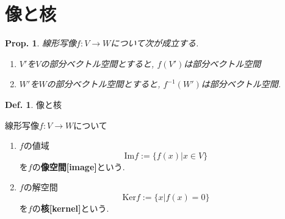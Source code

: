 \documentclass[a4paper,10pt,report]{amsart}
\theoremstyle{plain}
\newtheorem{prop}{Prop.}[section]
\theoremstyle{definition}
\newtheorem{defn}{Def.}[section]
\theoremstyle{remark}
\begin{document}
\section{像と核}
\begin{leftbar}
    \begin{prop}線形写像\(f:V\to W\)について次が成立する. 
        \begin{enumerate}
            \item \(V'\)を\(V\)の部分ベクトル空間とすると, \(f(V')\)は部分ベクトル空間
            \item \(W'\)を\(W\)の部分ベクトル空間とすると, \(f^{-1}(W')\)は部分ベクトル空間. 
        \end{enumerate}
    \end{prop}
\end{leftbar}
\begin{leftbar}
    \begin{defn}像と核\par
        線形写像\(f:V\to W\)について
        \begin{enumerate}
            \item 
            \(f\)の値域
            \begin{equation}
                \mathrm{Im}f:=\{f(x)|x\in V\}
            \end{equation}
            を\(f\)の\textbf{像空間[image]}という. 
            \item 
            \(f\)の解空間
            \begin{equation}
                \mathrm{Ker}f:=\{x|f(x)=0\}
            \end{equation}
            を\(f\)の\textbf{核[kernel]}という. 
        \end{enumerate}
    \end{defn}
\end{leftbar}
\end{document}
